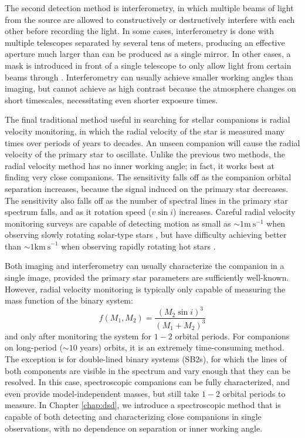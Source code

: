 \documentclass{utthesis}
\begin{document}
The second detection method is interferometry, in which multiple beams of light from the source are allowed to constructively or destructively interfere with each other before recording the light. In some cases, interferometry is done with multiple telescopes separated by several tens of meters, producing an effective aperture much larger than can be produced as a single mirror. In other cases, a mask is introduced in front of a single telescope to only allow light from certain beams through \citep[aperture masking,][]{Tuthill2000, Ireland2008}. Interferometry can usually achieve smaller working angles than imaging, but cannot achieve as high contrast \citep[see e.g.][]{Aldoretta2015} because the atmosphere changes on short timescales, necessitating even shorter exposure times.

The final traditional method useful in searching for stellar companions is radial velocity monitoring, in which the radial velocity of the star is measured many times over periods of years to decades. An unseen companion will cause the radial velocity of the primary star to oscillate. Unlike the previous two methods, the radial velocity method has no inner working angle; in fact, it works best at finding very close companions. The sensitivity falls off as the companion orbital separation increases, because the signal induced on the primary star decreases. The sensitivity also falls off as the number of spectral lines in the primary star spectrum falls, and as it rotation speed ($v\sin{i}$) increases. Careful radial velocity monitoring surveys are capable of detecting motion as small as $\sim 1 \mathrm{m\ s}^{-1}$ when observing slowly rotating solar-type stars \citep[e.g.][]{Wittenmyer2006, Fischer2009, Pepe2011}, but have difficulty achieving better than $\sim 1 \mathrm{km\ s}^{-1}$ when observing rapidly rotating hot stars \citep{Becker2015}.

Both imaging and interferometry can usually characterize the companion in a single image, provided the primary star parameters are sufficiently well-known. However, radial velocity monitoring is typically only capable of measuring the mass function of the binary system:
\begin{equation}
 f(M_1, M_2) = \frac{(M_2\sin{i})^3}{(M_1+M_2)^3}
 \end{equation}
 and only after monitoring the system for $1-2$ orbital periods. For companions on long-period ($\sim 10$ years) orbits, it is an extremely time-consuming method. The exception is for double-lined binary systems (SB2s), for which the lines of both components are visible in the spectrum and vary enough that they can be resolved. In this case, spectroscopic companions can be fully characterized, and even provide model-independent masses, but still take $1-2$ orbital periods to measure. In Chapter \ref{chap:dsd}, we introduce a spectroscopic method that is capable of both detecting and characterizing close companions in single observations, with no dependence on separation or inner working angle.
\end{document}
